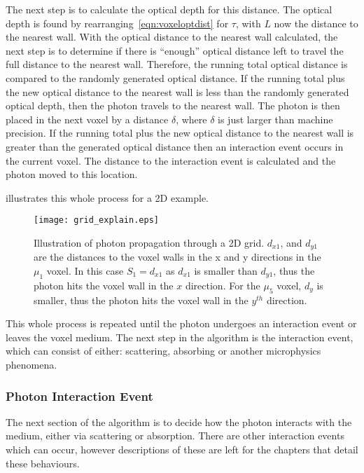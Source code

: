 The next step is to calculate the optical depth for this distance.
The optical depth is found by rearranging~\cref{eqn:voxeloptdist} for $\tau$, with $L$ now the distance to the nearest wall.
With the optical distance to the nearest wall calculated, the next step is to determine if there is ``enough'' optical distance left to travel the full distance to the nearest wall.
Therefore, the running total optical distance is compared to the randomly generated optical distance.
If the running total plus the new optical distance to the nearest wall is less than the randomly generated optical depth, then the photon travels to the nearest wall.
The photon is then placed in the next voxel by a distance $\delta$, where $\delta$ is just larger than machine precision.
If the running total plus the new optical distance to the nearest wall is greater than the generated optical distance then an interaction event occurs in the current voxel.
The distance to the interaction event is calculated and the photon moved to this location. 

 illustrates this whole process for a 2D example.

\begin{figure}[!htbp]
	\centering
	\texttt{[image: grid\_explain.eps]}
	\caption{Illustration of photon propagation through a 2D grid. $d_{x1}$, and $d_{y1}$ are the distances to the voxel walls in the x and y directions in the $\mu_1$ voxel. In this case $S_1=d_{x1}$ as $d_{x1}$ is smaller than $d_{y1}$, thus the photon hits the voxel wall in the $x$ direction. For the $\mu_5$ voxel, $d_y$ is smaller, thus the photon hits the voxel wall in the $y^{th}$ direction.}
	\label{fig:voxelpropexplain}
\end{figure}

This whole process is repeated until the photon undergoes an interaction event or leaves the voxel medium.
The next step in the algorithm is the interaction event, which can consist of either: scattering, absorbing or another microphysics phenomena. 

\subsubsection*{Photon Interaction Event}\label{sec:photscatterabsorb}

The next section of the algorithm is to decide how the photon interacts with the medium, either via scattering or absorption. There are other interaction events which can occur, however descriptions of these are left for the chapters that detail these behaviours.
\medskip

